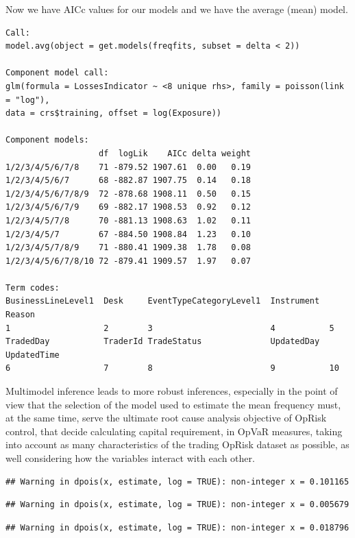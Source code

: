 \documentclass[]{article}
\begin{document}
\singlespacing

\doublespacing

Now we have AICc values for our models and we have the average (mean)
model.\medskip

\singlespacing
\begin{verbatim}
Call:
model.avg(object = get.models(freqfits, subset = delta < 2))

Component model call: 
glm(formula = LossesIndicator ~ <8 unique rhs>, family = poisson(link = "log"),
data = crs$training, offset = log(Exposure))

Component models: 
                   df  logLik    AICc delta weight
1/2/3/4/5/6/7/8    71 -879.52 1907.61  0.00   0.19
1/2/3/4/5/6/7      68 -882.87 1907.75  0.14   0.18
1/2/3/4/5/6/7/8/9  72 -878.68 1908.11  0.50   0.15
1/2/3/4/5/6/7/9    69 -882.17 1908.53  0.92   0.12
1/2/3/4/5/7/8      70 -881.13 1908.63  1.02   0.11
1/2/3/4/5/7        67 -884.50 1908.84  1.23   0.10
1/2/3/4/5/7/8/9    71 -880.41 1909.38  1.78   0.08
1/2/3/4/5/6/7/8/10 72 -879.41 1909.57  1.97   0.07

Term codes: 
BusinessLineLevel1  Desk     EventTypeCategoryLevel1  Instrument  Reason 
1                   2        3                        4           5 
TradedDay           TraderId TradeStatus              UpdatedDay  UpdatedTime 
6                   7        8                        9           10 
\end{verbatim}
\doublespacing

Multimodel inference leads to more robust inferences, especially in the
point of view that the selection of the model used to estimate the mean
frequency must, at the same time, serve the ultimate root cause analysis
objective of OpRisk control, that decide calculating capital
requirement, in OpVaR measures, taking into account as many
characteristics of the trading OpRisk dataset as possible, as well
considering how the variables interact with each other.

\begin{verbatim}
## Warning in dpois(x, estimate, log = TRUE): non-integer x = 0.101165
\end{verbatim}

\begin{verbatim}
## Warning in dpois(x, estimate, log = TRUE): non-integer x = 0.005679
\end{verbatim}

\begin{verbatim}
## Warning in dpois(x, estimate, log = TRUE): non-integer x = 0.018796
\end{verbatim}
\end{document}
